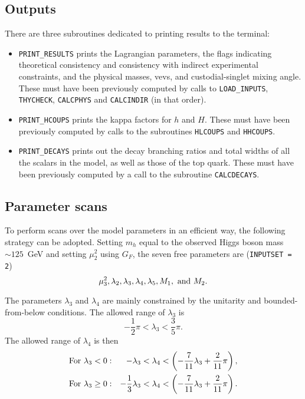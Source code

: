\documentclass[11pt]{article}
\begin{document}
\subsection{Outputs}
\label{sec:output}

There are three subroutines dedicated to printing results to the terminal:
\begin{itemize}
\item {\tt PRINT\_RESULTS} prints the Lagrangian parameters, the flags indicating theoretical consistency and consistency with indirect experimental constraints, and the physical masses, vevs, and custodial-singlet mixing angle.  These must have been previously computed by calls to {\tt LOAD\_INPUTS}, {\tt THYCHECK}, {\tt CALCPHYS} and {\tt CALCINDIR} (in that order).
\item {\tt PRINT\_HCOUPS} prints the kappa factors for $h$ and $H$.  These must have been previously computed by calls to the subroutines {\tt HLCOUPS} and {\tt HHCOUPS}.  
\item {\tt PRINT\_DECAYS} prints out the decay branching ratios and total widths of all the scalars in the model, as well as those of the top quark.  These must have been previously computed by a call to the subroutine {\tt CALCDECAYS}.
\end{itemize}


\subsection{Parameter scans}
\label{sec:scans}

To perform scans over the model parameters in an efficient way, the following strategy can be adopted.  Setting $m_h$ equal to the observed Higgs boson mass $\sim 125$~GeV and setting $\mu_2^2$ using $G_F$, the seven free parameters are ({\tt INPUTSET = 2})
\begin{equation}
	\mu_3^2, \lambda_2, \lambda_3, \lambda_4, \lambda_5, M_1, \ {\rm and} \ M_2.
\end{equation}

The parameters $\lambda_3$ and $\lambda_4$ are mainly constrained by the unitarity and bounded-from-below conditions.  The allowed range of $\lambda_3$ is
\begin{equation}
	- \frac{1}{2} \pi < \lambda_3 < \frac{3}{5} \pi.
\end{equation}
The allowed range of $\lambda_4$ is then
\begin{eqnarray}
	{\rm For} \ \lambda_3 < 0: && 
		-\lambda_3 < \lambda_4 < \left( -\frac{7}{11}\lambda_3 + \frac{2}{11} \pi \right), 
		\nonumber \\ 
	{\rm For} \ \lambda_3 \geq 0: && 
		-\frac{1}{3} \lambda_3 < \lambda_4 < \left( -\frac{7}{11}\lambda_3 + \frac{2}{11} \pi \right).
\end{eqnarray}
\end{document}
